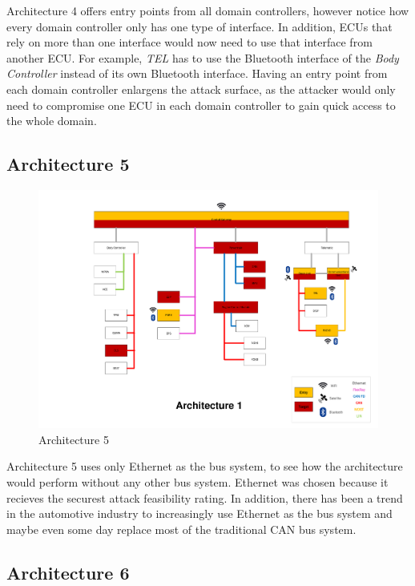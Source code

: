 Architecture 4 offers entry points from all domain controllers, however notice how every domain controller only has one type of interface.
In addition, ECUs that rely on more than one interface would now need to use that interface from another ECU.
For example, \textit{TEL} has to use the Bluetooth interface of the \textit{Body Controller} instead of its own Bluetooth interface.
Having an entry point from each domain controller enlargens the attack surface, as the attacker would only need to compromise one ECU in each domain controller to gain quick access to the whole domain.\par


\subsection*{Architecture 5}
\label{sec:arch5}

\begin{figure}[h!]
    \caption{Architecture 5}
    \includegraphics[width=\textwidth, page=5]{../Architectures-survey.pdf}
\end{figure}

Architecture 5 uses only Ethernet as the bus system, to see how the architecture would perform without any other bus system.
Ethernet was chosen because it recieves the securest attack feasibility rating.
In addition, there has been a trend in the automotive industry to increasingly use Ethernet as the bus system and maybe even some day replace most of the traditional CAN bus system.\par


\subsection*{Architecture 6}
\label{sec:arch6}

